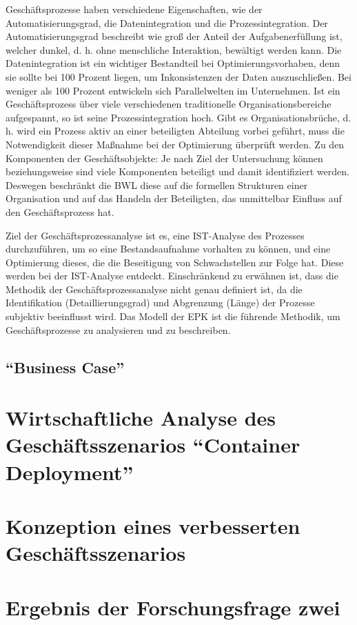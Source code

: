 Geschäftsprozesse haben verschiedene Eigenschaften, wie der Automatisierungsgrad, die Datenintegration und die Prozessintegration. Der Automatisierungsgrad beschreibt wie groß der Anteil der Aufgabenerfüllung ist, welcher dunkel, d. h. ohne menschliche Interaktion, bewältigt werden kann. Die Datenintegration ist ein wichtiger Bestandteil bei Optimierungsvorhaben, denn sie sollte bei 100 Prozent liegen, um Inkonsistenzen der Daten auszuschließen. Bei weniger als 100 Prozent entwickeln sich Parallelwelten im Unternehmen. Ist ein Geschäftsprozess über viele verschiedenen traditionelle Organisationsbereiche aufgespannt, so ist seine Prozessintegration hoch. Gibt es Organisationsbrüche, d. h. wird ein Prozess aktiv an einer beteiligten Abteilung vorbei geführt, muss die Notwendigkeit dieser Maßnahme bei der Optimierung überprüft werden. Zu den Komponenten der Geschäftsobjekte: Je nach Ziel der Untersuchung können beziehungsweise sind viele Komponenten beteiligt und damit identifiziert werden. Deswegen beschränkt die \ac{BWL} diese auf die formellen Strukturen einer Organisation und auf das Handeln der Beteiligten, das unmittelbar Einfluss auf den Geschäftsprozess hat.\autocite[vgl.][S.15]{staud_geschaftsprozessanalyse_2006} \par

Ziel der Geschäftsprozessanalyse ist es, eine IST-Analyse des Prozesses durchzuführen, um so eine Bestandsaufnahme vorhalten zu können, und eine Optimierung dieses, die die Beseitigung von Schwachstellen zur Folge hat. Diese werden bei der IST-Analyse entdeckt. Einschränkend zu erwähnen ist, dass die Methodik der Geschäftsprozessanalyse nicht genau definiert ist, da die Identifikation (Detaillierungsgrad) und Abgrenzung (Länge) der Prozesse subjektiv beeinflusst wird. Das Modell der \ac{EPK} ist die führende Methodik, um Geschäftsprozesse zu analysieren und zu beschreiben.\autocite[vgl.][S.59]{staud_geschaftsprozessanalyse_2006}
\subsection{\enquote{Business Case}}

\section{Wirtschaftliche Analyse des Geschäftsszenarios \enquote{Container Deployment}}

\section{Konzeption eines verbesserten Geschäftsszenarios}

\section{Ergebnis der Forschungsfrage zwei}
